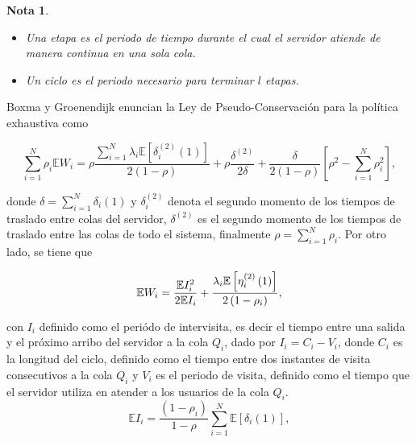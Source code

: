 \documentclass{article}
\newtheorem{Note}{Nota}[section]
\newcommand{\esp}{\mathbb{E}}
\numberwithin{equation}{section}
\begin{document}
\begin{Note}
\begin{itemize}
\item[a) ] Una etapa es el periodo de tiempo durante el cual el
servidor atiende de manera continua en una sola cola.

\item[b) ] Un ciclo  es el periodo necesario para terminar $l$ etapas.
\end{itemize}
\end{Note}

Boxma y Groenendijk \cite{Boxma2} enuncian la Ley de Pseudo-Conservaci\'on para la pol\'itica exhaustiva como

\begin{equation}\label{LPCPE}
\sum_{i=1}^{N}\rho_{i}\esp
W_{i}=\rho\frac{\sum_{i=1}^{N}\lambda_{i}\esp\left[\delta_{i}^{(2)}\left(1\right)\right]}{2\left(1-\rho\right)}+\rho\frac{\delta^{(2)}}{2\delta}+\frac{\delta}{2\left(1-\rho\right)}\left[\rho^{2}-\sum_{i=1}^{N}\rho_{i}^{2}\right],
\end{equation}

donde $\delta=\sum_{i=1}^{N}\delta_{i}\left(1\right)$ y
$\delta_{i}^{(2)}$ denota el segundo momento de los tiempos de traslado entre colas del servidor, $\delta^{(2)}$ es el segundo momento de los tiempos de traslado entre las colas de todo el sistema, finalmente $\rho=\sum_{i=1}^{N}\rho_{i}$. Por otro lado, se tiene que

\begin{equation}\label{Eq.Tiempo.Espera}\index{Tiempos de Espera}
\esp W_{i}=\frac{\esp I_{i}^{2}}{2\esp
I_{i}}+\frac{\lambda_{i}\esp\left[\eta_{i}^{(2)}\left(1\right)\right]}{2\left(1-\rho_{i}\right)},
\end{equation}

con $I_{i}$ definido como el peri\'odo de intervisita, es decir el tiempo entre una salida y el pr\'oximo arribo del servidor a la cola $Q_{i}$, dado por $I_{i}=C_{i}-V_{i}$, donde $C_{i}$ es la longitud del ciclo, definido como el tiempo entre dos instantes de visita consecutivos a la cola $Q_{i}$ y $V_{i}$ es el periodo de visita, definido como el tiempo que el servidor utiliza en atender a los usuarios de la cola $Q_{i}$.
\begin{equation}\label{Eq.Periodo.Intervisita}
\esp
I_{i}=\frac{\left(1-\rho_{i}\right)}{1-\rho}\sum_{i=1}^{N}\esp\left[\delta_{i}\left(1\right)\right],
\end{equation}
\end{document}
